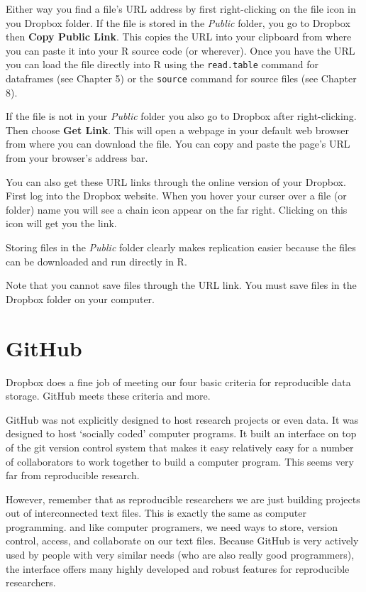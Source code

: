 \documentclass[ChapterTOCs,krantz1]{krantz}\usepackage{graphicx, color}
\begin{document}
Either way you find a file's URL address by first right-clicking on the
file icon in you Dropbox folder. If the file is stored in the
\emph{Public} folder, you go to Dropbox then \textbf{Copy
Public Link}. This copies the URL into your clipboard from where you can
paste it into your R source code (or wherever). Once you have
the URL you can load the file directly into R using the
\texttt{read.table} command for dataframes (see Chapter 5) or the \texttt{source}
command for source files (see Chapter 8).

If the file is not in your \emph{Public} folder you also go to
Dropbox after right-clicking. Then choose \textbf{Get Link}.
This will open a webpage in your default web browser from where you can
download the file. You can copy and paste the page's URL from your
browser's address bar.

You can also get these URL links through the online version of your
Dropbox. First log into the Dropbox website. When you
hover your curser over a file (or folder) name you will see a chain icon
appear on the far right. Clicking on this icon will get you the link.

Storing files in the \emph{Public} folder clearly makes replication
easier because the files can be downloaded and run directly in
R.

Note that you cannot save files through the URL link. You must save
files in the Dropbox folder on your computer.

\section{GitHub}

Dropbox does a fine job of meeting our four basic criteria for
reproducible data storage. GitHub meets these criteria and
more.

GitHub was not explicitly designed to host research projects or
even data. It was designed to host `socially coded' computer programs.
It built an interface on top of the git version control system
that makes it easy relatively easy for a number of collaborators to work
together to build a computer program. This seems very far from
reproducible research.

However, remember that as reproducible researchers we are just building
projects out of interconnected text files. This is exactly the same as
computer programming. and like computer programers, we need ways to
store, version control, access, and collaborate on our text files.
Because GitHub is very actively used by people with very
similar needs (who are also really good programmers), the interface
offers many highly developed and robust features for reproducible
researchers.
\end{document}
